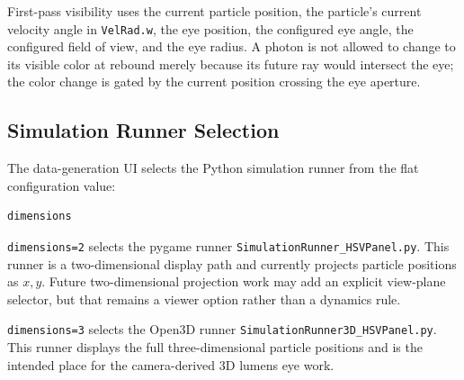 First-pass visibility uses the current particle position, the particle's
current velocity angle in \texttt{VelRad.w}, the eye position, the configured
eye angle, the configured field of view, and the eye radius.  A photon is not
allowed to change to its visible color at rebound merely because its future
ray would intersect the eye; the color change is gated by the current
position crossing the eye aperture.

\subsection{Simulation Runner Selection}

The data-generation UI selects the Python simulation runner from the flat
configuration value:
\begin{verbatim}
dimensions
\end{verbatim}

\texttt{dimensions=2} selects the pygame runner
\texttt{SimulationRunner\_HSVPanel.py}.  This runner is a two-dimensional
display path and currently projects particle positions as \(x,y\).  Future
two-dimensional projection work may add an explicit view-plane selector, but
that remains a viewer option rather than a dynamics rule.

\texttt{dimensions=3} selects the Open3D runner
\texttt{SimulationRunner3D\_HSVPanel.py}.  This runner displays the full
three-dimensional particle positions and is the intended place for the
camera-derived 3D lumens eye work.

